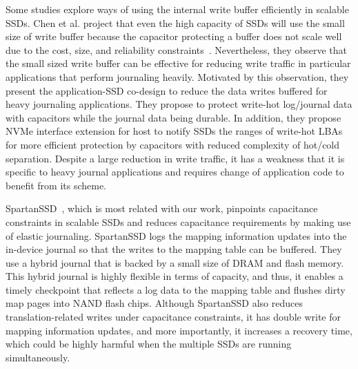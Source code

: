 Some studies explore ways of using the internal write buffer efficiently in
scalable SSDs. Chen et al. project that even the high capacity of SSDs will use
the small size of write buffer because the capacitor protecting a buffer
does not scale well due to the cost, size, and reliability
constraints~\cite{ChenLZ19tc}. Nevertheless, they observe that the small sized
write buffer can be effective for reducing write traffic in particular
applications that perform journaling heavily. Motivated by this observation,
they present the application-SSD co-design to reduce the data writes buffered
for heavy journaling applications. They propose to protect write-hot
log/journal data with capacitors while the journal data being durable.  In
addition, they propose NVMe interface extension for host to notify SSDs the
ranges of write-hot LBAs for more efficient protection by capacitors with
reduced complexity of hot/cold separation. 
Despite a large reduction in write traffic, it has a weakness that it is specific to heavy journal applications and requires change of application code to benefit from its scheme.

SpartanSSD~\cite{lee2021spartanssd}, which is most related with our work,
pinpoints capacitance constraints in scalable SSDs and reduces capacitance
requirements by making use of elastic journaling. SpartanSSD logs the mapping
information updates into the in-device journal so that the writes to the
mapping table can be buffered. They use a hybrid journal that is backed by a
small size of DRAM and flash memory. This hybrid journal is highly flexible in
terms of capacity, and thus, it enables a timely checkpoint that reflects a log
data to the mapping table and flushes dirty map pages into NAND flash chips.
Although SpartanSSD also reduces translation-related writes under capacitance
constraints, it has double write for mapping information updates, and more importantly,
it increases a recovery time, which could be highly harmful
when the multiple SSDs are running simultaneously. 
